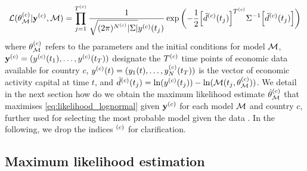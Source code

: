 \begin{equation}\label{eq:likelihood_lognormal}
  \mathcal{L}(\theta^{(c)}_{\mathcal{M}} | {\textbf{y}^{(c)} }, \mathcal{M}) = \prod_{j=1}^{T^{(c)}} \frac{1}{\sqrt{(2\pi)^{N^{(c)}}|\Sigma|} y^{(c)}(t_j)} \exp \left(-\frac{1}{2} \Big[ \tilde{d}^{(c)}(t_j)\Big]^{T^{(c)}} \Sigma^{-1} \Big[ \tilde{d}^{(c)}(t_j)\Big] \right)
\end{equation}
% 
where $\theta^{(c)}_{\mathcal{M}}$ refers to the parameters and the initial conditions for model $\mathcal{M}$, $\textbf{y}^{(c)} = (y^{(c)}(t_1), \dots, y^{(c)}(t_T))$  designate the $T^{(c)}$ time points of economic data available for country $c$, $ y^{(c)}(t) = (y_1(t), \dots, y^{(c)}_N(t_T))$ is the vector of economic activity capital at time $t$, and $\tilde{d}^{(c)}(t_j) = \ln(y^{(c)}(t_j)) - \ln(\mathcal{M}(t_j,\theta^{(c)}_{\mathcal{M}}))$. 
% 
We detail in the next section how do we obtain the maximum likelihood estimate $\hat\theta^{(c)}_{\mathcal{M}}$ that maximises \cref{eq:likelihood_lognormal} given $\textbf{y}^{(c)}$ for each model $\mathcal{M}$ and country $c$, further used for selecting the most probable model given the data \citep{Burnham2002}. In the following, we drop the indices $^{(c)}$ for clarification.

\subsection{Maximum likelihood estimation}\label{parameter-inference}

